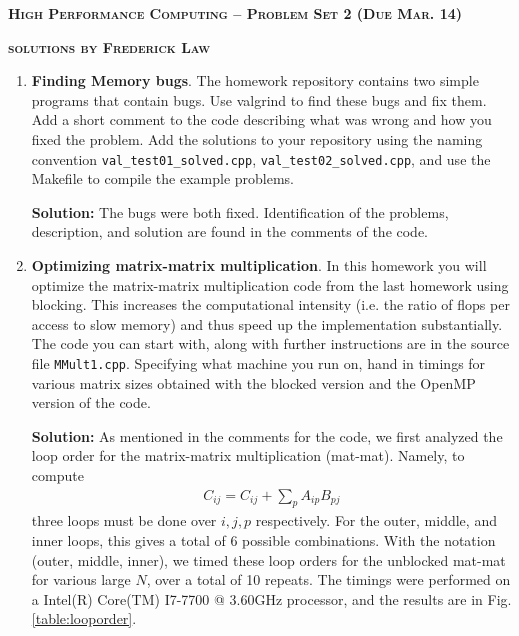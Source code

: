 \documentclass[10pt]{article}
\begin{document}
{ \large \textbf{\textsc{High Performance Computing -- Problem Set 2 (Due Mar. 14)}}}

{ \large \textbf{\textsc{solutions by Frederick Law}}}

\thispagestyle{empty}
\vspace{0.1in}


\begin{enumerate}
\item \textbf{Finding Memory bugs}. The homework repository contains two simple programs that contain bugs. Use valgrind to find these bugs and fix them. Add a short comment to the code describing what was wrong and how you fixed the problem. Add the solutions to your repository using the naming convention \texttt{val\_test01\_solved.cpp}, \texttt{val\_test02\_solved.cpp}, and use the Makefile to compile the example problems.

\textbf{Solution:} The bugs were both fixed. Identification of the problems, description, and solution are found in the comments of the code.






\item \textbf{Optimizing matrix-matrix multiplication}. In this homework you will optimize the matrix-matrix multiplication code from the last homework using blocking. This increases the computational intensity (i.e. the ratio of flops per access to slow memory) and thus speed up the implementation substantially. The code you can start with, along with further instructions are in the source file \texttt{MMult1.cpp}. Specifying what machine you run on, hand in timings for various matrix sizes obtained with the blocked version and the OpenMP version of the code.

\textbf{Solution:} As mentioned in the comments for the code, we first analyzed the loop order for the matrix-matrix multiplication (mat-mat). Namely, to compute
\begin{align*}
C_{ij} = C_{ij} + \sum_{p} A_{ip} B_{pj}
\end{align*}
three loops must be done over $i,j,p$ respectively. For the outer, middle, and inner loops, this gives a total of 6 possible combinations. With the notation (outer, middle, inner), we timed these loop orders for the unblocked mat-mat for various large $N$, over a total of 10 repeats. The timings were performed on a Intel(R) Core(TM) I7-7700 @ 3.60GHz processor, and the results are in Fig. \ref{table:looporder}.


\end{enumerate}
\end{document}
